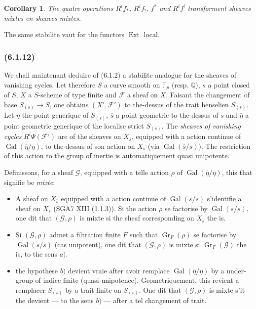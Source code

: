\documentclass[12pt,a4paper]{article}
\theoremstyle{plain}
\newtheorem{corollary}[theorem]{Corollary}
\theoremstyle{definition}
\theoremstyle{remark}
\DeclareMathOperator{\Ext}{Ext}
\DeclareMathOperator{\Gal}{Gal}
\DeclareMathOperator{\Gr}{Gr}
\newcommand{\bbQ}{\mathbb{Q}}
\newcommand{\scrF}{\mathscr{F}}
\newcommand{\scrG}{\mathscr{G}}
\newcommand{\Fp}{\mathbb{F}_p}
\begin{document}
\begin{corollary}
The quatre operations $R^i f_*$, $R^i f_!$, $f^*$ and $R^i f^!$ transforment sheaves mixtes en sheaves mixtes.
\end{corollary}

The same stabilite vaut for the functors $\Ext$ local.

\subsubsection*{\textup{(6.1.12)}}

We shall maintenant deduire of (6.1.2) a stabilite analogue for the sheaves of vanishing cycles. Let therefore $S$ a curve smooth on $\Fp$ (resp. $\bbQ$), $s$ a point closed of $S$, $X$ a $S$-scheme of type finite and $\scrF$ a sheaf on $X$. Faisant the changement of base $S_{(s)} \to S$, one obtains $(X', \scrF')$ to the-dessus of the trait henselien $S_{(s)}$. Let $\eta$ the point generique of $S_{(s)}$, $\overline{s}$ a point geometric to the-dessus of $s$ and $\overline{\eta}$ a point geometric generique of the localise strict $S_{(\overline{s})}$. The \emph{sheaves of vanishing cycles} $R^i \Psi(\scrF')$ are of the sheaves on $X_{\overline{s}}$, equipped with a action continue of $\Gal(\overline{\eta}/\eta)$, to the-dessus of son action on $X_{\overline{s}}$ (via $\Gal(\overline{s}/s)$). The restriction of this action to the group of inertie is automatiquement quasi unipotente.

Definissons, for a sheaf $\scrG$, equipped with a telle action $\rho$ of $\Gal(\overline{\eta}/\eta)$, this that signifie be \emph{mixte}:
\begin{itemize}
\item[$a)$] A sheaf on $X_{\overline{s}}$ equipped with a action continue of $\Gal(\overline{s}/s)$ s'identifie a sheaf on $X_s$ (SGA7 XIII (1.1.3)). Si the action $\rho$ se factorise by $\Gal(\overline{s}/s)$, one dit that $(\scrG, \rho)$ is mixte si the sheaf corresponding on $X_s$ the is.
\item[$b)$] Si $(\scrG, \rho)$ admet a filtration finite $F$ such that $\Gr_F(\rho)$ se factorise by $\Gal(\overline{s}/s)$ (cas unipotent), one dit that $(\scrG, \rho)$ is mixte si $\Gr_F(\scrG)$ the is, to the sens $a)$.
\item[$c)$] the hypothese $b)$ devient vraie after avoir remplace $\Gal(\overline{\eta}/\eta)$ by a under-group of indice finite (quasi-unipotence). Geometriquement, this revient a remplacer $S_{(s)}$ by a trait finite on $S_{(s)}$. One dit that $(\scrG, \rho)$ is mixte s'it the devient --- to the sens $b)$ --- after a tel changement of trait.
\end{itemize}
\end{document}
